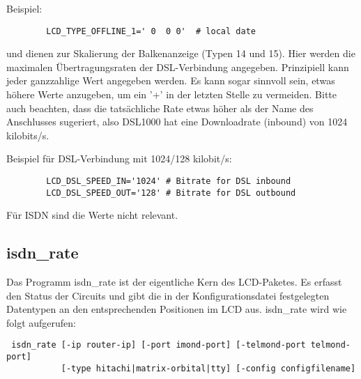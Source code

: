 \begin{description}
        Beispiel:
\begin{example}
\begin{verbatim}
        LCD_TYPE_OFFLINE_1=' 0  0 0'  # local date
\end{verbatim}
\end{example}

         und  
        dienen zur Skalierung der Balkenanzeige (Typen 14 und 15). Hier werden die maximalen
        Übertragungsraten der DSL-Verbindung angegeben. Prinzipiell kann jeder ganzzahlige 
        Wert angegeben werden. Es kann sogar sinnvoll sein, etwas höhere Werte anzugeben,
        um ein '+' in der letzten Stelle zu vermeiden.
        Bitte auch beachten, dass die tatsächliche Rate etwas höher als der Name des 
        Anschlusses sugeriert, also DSL1000 hat eine Downloadrate (inbound) von 1024 kilobits/s. 

        Beispiel für DSL-Verbindung mit 1024/128 kilobit/s:
\begin{example}
\begin{verbatim}
        LCD_DSL_SPEED_IN='1024' # Bitrate for DSL inbound
        LCD_DSL_SPEED_OUT='128' # Bitrate for DSL outbound
\end{verbatim}
\end{example}

        Für ISDN sind die Werte nicht relevant. 
        
\end{description}

\subsection{isdn\_rate}
 Das Programm \glqq{}isdn\_rate\grqq{} ist der eigentliche Kern des LCD-Paketes. Es erfasst den Status der Circuits
 und gibt die in der Konfigurationsdatei festgelegten Datentypen an den entsprechenden Positionen im LCD
 aus.
 isdn\_rate wird wie folgt aufgerufen:
 
\begin{example}
\begin{verbatim}
 isdn_rate [-ip router-ip] [-port imond-port] [-telmond-port telmond-port]
           [-type hitachi|matrix-orbital|tty] [-config configfilename]
\end{verbatim}
\end{example}


